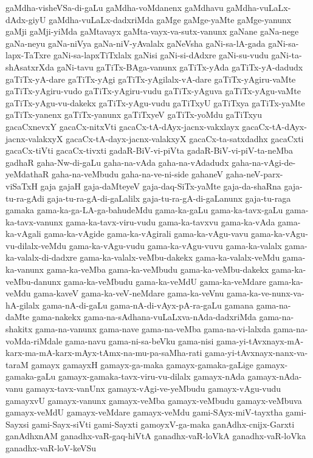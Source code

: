 {gaMdha-visheVSa-di-gaLu
gaMdha-voMdanenx
gaMdhavu
gaMdha-vuLaLx-dAdx-giyU
gaMdha-vuLaLx-dadxriMda
gaMge
gaMge-yaMte
gaMge-yanunx
gaMji
gaMji-yiMda
gaMtavayx
gaMta-vayx-va-sutx-vanunx
gaNane
gaNa-nege
gaNa-neyu
gaNa-niVya
gaNa-niV-yAvalalx
gaNeVsha
gaNi-sa-lA-gada
gaNi-sa-lapx-TaTxre
gaNi-sa-lapxTiTxlalx
gaNisi
gaNi-si-dAdxre
gaNi-su-vudu
gaNi-ta-shAsatxrXda
gaNi-tavu
gaTiTx-BAga-vanunx
gaTiTx-yAda
gaTiTx-yA-dadudx
gaTiTx-yA-dare
gaTiTx-yAgi
gaTiTx-yAgilalx-vA-dare
gaTiTx-yAgiru-vaMte
gaTiTx-yAgiru-vudo
gaTiTx-yAgiru-vudu
gaTiTx-yAguva
gaTiTx-yAgu-vaMte
gaTiTx-yAgu-vu-dakekx
gaTiTx-yAgu-vudu
gaTiTxyU
gaTiTxya
gaTiTx-yaMte
gaTiTx-yanenx
gaTiTx-yanunx
gaTiTxyeV
gaTiTx-yoMdu
gaTiTxyu
gacaCxnevxY
gacaCx-nitxVti
gacaCx-tA-dAyx-jacnx-vakxlayx
gacaCx-tA-dAyx-jacnx-valakxyX
gacaCx-tA-dayx-jacnx-valakxyX
gacaCx-ta-satxdadhx
gacaCxti
gacaCx-tiVti
gacaCx-tivxti
gadaR-BiV-vi-piVta
gadaR-BiV-vi-piV-ta-neMba
gadhaR
gaha-Nw-di-gaLu
gaha-na-vAda
gaha-na-vAdadudx
gaha-na-vAgi-de-yeMdathaR
gaha-na-veMbudu
gaha-na-ve-ni-side
gahaneV
gaha-neV-parx-viSaTxH
gaja
gajaH
gaja-daMteyeV
gaja-daq-SiTx-yaMte
gaja-da-shaRna
gaja-tu-ra-gAdi
gaja-tu-ra-gA-di-gaLalilx
gaja-tu-ra-gA-di-gaLanunx
gaja-tu-raga
gamaka
gama-ka-ga-LA-ga-bahudeMdu
gama-ka-gaLu
gama-ka-tavx-gaLu
gama-ka-tavx-vanunx
gama-ka-tavx-viru-vudu
gama-ka-tavxvu
gama-ka-vAda
gama-ka-vAgali
gama-ka-vAgide
gama-ka-vAgirali
gama-ka-vAgu-vavu
gama-ka-vAgu-vu-dilalx-veMdu
gama-ka-vAgu-vudu
gama-ka-vAgu-vuvu
gama-ka-valalx
gama-ka-valalx-di-dadxre
gama-ka-valalx-veMbu-dakekx
gama-ka-valalx-veMdu
gama-ka-vanunx
gama-ka-veMba
gama-ka-veMbudu
gama-ka-veMbu-dakekx
gama-ka-veMbu-danunx
gama-ka-veMbudu
gama-ka-veMdU
gama-ka-veMdare
gama-ka-veMdu
gama-kaveV
gama-ka-veV-neMdare
gama-ka-veVnu
gama-ka-ve-nunx-va-hA-gilalx
gama-nA-di-gaLu
gama-nA-di-vAyx-pA-ra-gaLu
gamana
gama-na-daMte
gama-nakekx
gama-na-sAdhana-vuLaLxva-nAda-dadxriMda
gama-na-shakitx
gama-na-vanunx
gama-nave
gama-na-veMba
gama-na-vi-lalxda
gama-na-voMda-riMdale
gama-navu
gama-ni-sa-beVku
gama-nisi
gama-yi-tAvxnayx-mA-karx-ma-mA-karx-mAyx-tAmx-na-mu-pa-saMha-rati
gama-yi-tAvxnayx-nanx-va-taraM
gamayx
gamayxH
gamayx-ga-maka
gamayx-gamaka-gaLige
gamayx-gamaka-gaLu
gamayx-gamaka-tavx-viru-vu-dilalx
gamayx-nAda
gamayx-nAda-vanu
gamayx-tavx-vanUnx
gamayx-vAgi-ve-yeMbudu
gamayx-vAgu-vudu
gamayxvU
gamayx-vanunx
gamayx-veMba
gamayx-veMbudu
gamayx-veMbuva
gamayx-veMdU
gamayx-veMdare
gamayx-veMdu
gami-SAyx-miV-tayxtha
gami-Sayxsi
gami-Sayx-siVti
gami-Sayxti
gamoyxV-ga-maka
ganAdhx-cnijx-Garxti
ganAdhxnAM
ganadhx-vaR-gaq-hiVtA
ganadhx-vaR-loVkA
ganadhx-vaR-loVka
ganadhx-vaR-loV-keVSu
}
